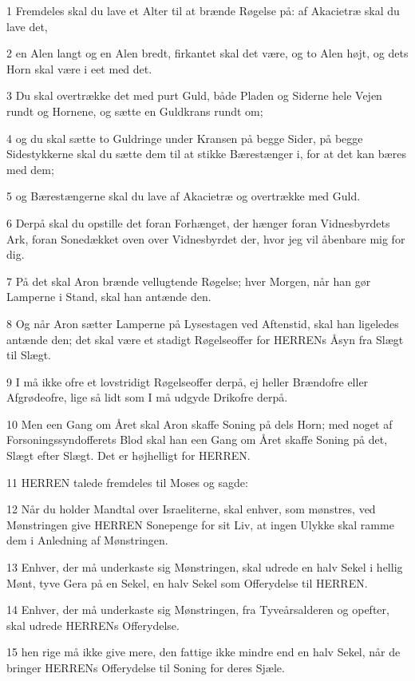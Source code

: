 \par 1 Fremdeles skal du lave et Alter til at brænde Røgelse på: af Akacietræ skal du lave det,
\par 2 en Alen langt og en Alen bredt, firkantet skal det være, og to Alen højt, og dets Horn skal være i eet med det.
\par 3 Du skal overtrække det med purt Guld, både Pladen og Siderne hele Vejen rundt og Hornene, og sætte en Guldkrans rundt om;
\par 4 og du skal sætte to Guldringe under Kransen på begge Sider, på begge Sidestykkerne skal du sætte dem til at stikke Bærestænger i, for at det kan bæres med dem;
\par 5 og Bærestængerne skal du lave af Akacietræ og overtrække med Guld.
\par 6 Derpå skal du opstille det foran Forhænget, der hænger foran Vidnesbyrdets Ark, foran Sonedækket oven over Vidnesbyrdet der, hvor jeg vil åbenbare mig for dig.
\par 7 På det skal Aron brænde vellugtende Røgelse; hver Morgen, når han gør Lamperne i Stand, skal han antænde den.
\par 8 Og når Aron sætter Lamperne på Lysestagen ved Aftenstid, skal han ligeledes antænde den; det skal være et stadigt Røgelseoffer for HERRENs Åsyn fra Slægt til Slægt.
\par 9 I må ikke ofre et lovstridigt Røgelseoffer derpå, ej heller Brændofre eller Afgrødeofre, lige så lidt som I må udgyde Drikofre derpå.
\par 10 Men een Gang om Året skal Aron skaffe Soning på dels Horn; med noget af Forsoningssyndofferets Blod skal han een Gang om Året skaffe Soning på det, Slægt efter Slægt. Det er højhelligt for HERREN.
\par 11 HERREN talede fremdeles til Moses og sagde:
\par 12 Når du holder Mandtal over Israeliterne, skal enhver, som mønstres, ved Mønstringen give HERREN Sonepenge for sit Liv, at ingen Ulykke skal ramme dem i Anledning af Mønstringen.
\par 13 Enhver, der må underkaste sig Mønstringen, skal udrede en halv Sekel i hellig Mønt, tyve Gera på en Sekel, en halv Sekel som Offerydelse til HERREN.
\par 14 Enhver, der må underkaste sig Mønstringen, fra Tyveårsalderen og opefter, skal udrede HERRENs Offerydelse.
\par 15 hen rige må ikke give mere, den fattige ikke mindre end en halv Sekel, når de bringer HERRENs Offerydelse til Soning for deres Sjæle.
